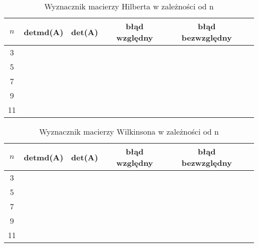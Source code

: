 \documentclass[12pt]{article}
\begin{document}
\begin{table}[h!]
\caption{\footnotesize Wyznacznik macierzy Hilberta w zale\.zno\'sci od n}%
\renewcommand{\arraystretch}{1.1}
\centering\begin{tabular}{|c|c|c|c|c|c|}
\hline $n$ & detmd(A) & det(A) & b\l{}\k{a}d wzgl\k{e}dny & b\l{}\k{a}d bezwzgl\k{e}dny\\
\hline 3 &  &  &  &   \\
\hline 5 &  &  &  &    \\
\hline 7 &   &  &  &     \\
\hline 9 &   &  &  &     \\
\hline 11 &   &  &  &    \\
\hline
\end{tabular}
\label{WyznacznikHilb}
\end{table}

\begin{table}[h!]
\caption{\footnotesize Wyznacznik macierzy Wilkinsona w zale\.zno\'sci od n}%
\renewcommand{\arraystretch}{1.1}
\centering\begin{tabular}{|c|c|c|c|c|c|}
\hline $n$ & detmd(A) & det(A) & b\l{}\k{a}d wzgl\k{e}dny & b\l{}\k{a}d bezwzgl\k{e}dny\\
\hline 3 &  &  &  &   \\
\hline 5 &  &  &  &    \\
\hline 7 &   &  &  &     \\
\hline 9 &   &  &  &     \\
\hline 11 &   &  &  &    \\
\hline
\end{tabular}
\label{WyznacznikWilk}
\end{table}
\end{document}
